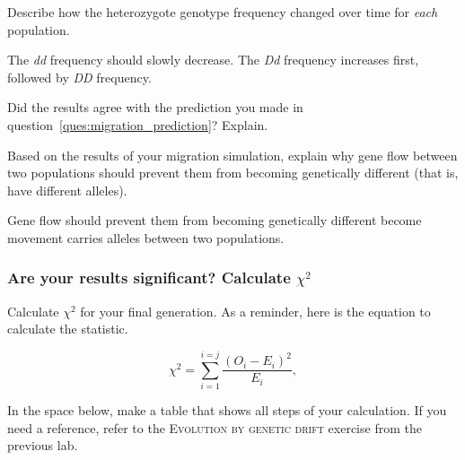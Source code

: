 \documentclass[12pt]{exam}
\newcommand*\AnswerBox[2]{%
    \parbox[t][#1]{0.92\textwidth}{%
    \begin{solution}#2\end{solution}}
    \vspace{\stretch{1}}
}
\newlength{\basespace}
\newcommand{\allele}[1]{\textit{#1}}
\begin{document}
\begin{questions}
\AnswerBox{1.2\basespace}{%
}

\question
Describe how the heterozygote genotype frequency changed over time for \emph{each} population.

\AnswerBox{0.8\basespace}{The \allele{dd} frequency should slowly decrease. The \allele{Dd} frequency increases first, followed by \allele{DD} frequency.}

\question
Did the results agree with the prediction you made in question~\ref{ques:migration_prediction}? Explain.

\AnswerBox{0.5\basespace}{%
}

\question[Checkout]
Based on the results of your migration simulation, explain why gene flow between two populations should prevent them from becoming genetically different (that is, have different alleles).

\AnswerBox{0\basespace}{Gene flow should prevent them from becoming genetically different become movement carries alleles between two populations.}

\newpage

\subsubsection*{Are your results significant? Calculate $\chi^2$}\label{sec:chi_square}

\question[Checkout]
Calculate $\chi^2$ for your final generation. As a reminder, here is the equation to calculate the statistic.

\[\chi^2 = \sum_{i=1}^{i=j}\frac{(O_i - E_i)^2}{E_i}, \]

In the space below, make a table that shows all steps of your calculation. If you need a reference, refer to the \textsc{Evolution by genetic drift} exercise from the previous lab.


\newpage

\begin{landscape}


\end{landscape}
\end{questions}
\end{document}
